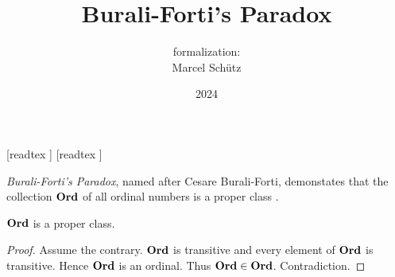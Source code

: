 \documentclass{article}
\title{Burali-Forti's Paradox}
\author{\Naproche formalization: \vspace{0.5em} \\
Marcel Schütz}
\date{2024}
\begin{document}
  \maketitle

  \begin{imports}
    \begin{forthel}
      [readtex ]
      [readtex ]
    \end{forthel}
  \end{imports}
  
  \noindent \emph{Burali-Forti's Paradox}, named after Cesare Burali-Forti, 
  demonstates that the collection $\textbf{Ord}$ of all ordinal numbers is a
  proper class \cite{BuraliForti1897}.

  \begin{forthel}
    \begin{theorem*}\label{burali_forti_paradox}
      $\textbf{Ord}$ is a proper class.
    \end{theorem*}
    \begin{proof}
      Assume the contrary.
      $\textbf{Ord}$ is transitive and every element of $\textbf{Ord}$ is transitive.
      Hence $\textbf{Ord}$ is an ordinal.
      Thus $\textbf{Ord} \in \textbf{Ord}$.
      Contradiction.
    \end{proof}
  \end{forthel}

  \printbibliography
\end{document}
